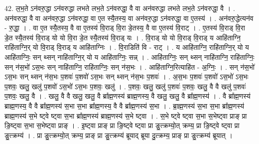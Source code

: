 \documentclass[17pt]{extarticle}
\begin{document}
42. ल॒भ॒ते ऽन॑वरु॒द्धा ऽन॑वरुद्धा लभते लभ॒ते ऽन॑वरुद्धा॒ वै वा अन॑वरुद्धा लभते लभ॒ते ऽन॑वरुद्धा॒ वै । . अन॑वरुद्धा॒ वै वा अन॑वरु॒द्धा ऽन॑वरुद्धा॒ वा ए॒त स्यै॒तस्य॒ वा अन॑वरु॒द्धा ऽन॑वरुद्धा॒ वा ए॒तस्य॑ । . अन॑वरु॒द्धेत्यन॑व - रु॒द्धा॒ । . वा ए॒त स्यै॒तस्य॒ वै वा ए॒तस्य॑ वि॒राड् वि॒रा डे॒तस्य॒ वै वा ए॒तस्य॑ वि॒राट् । . ए॒तस्य॑ वि॒राड् वि॒रा डे॒त स्यै॒तस्य॑ वि॒राड् यो यो वि॒रा डे॒त स्यै॒तस्य॑ वि॒राड् यः । . वि॒राड् यो यो वि॒राड् वि॒राड् य आहि॑ताग्नि॒ राहि॑ताग्नि॒र् यो वि॒राड् वि॒राड् य आहि॑ताग्निः । . वि॒राडिति॑ वि - राट् । . य आहि॑ताग्नि॒ राहि॑ताग्नि॒र् यो य आहि॑ताग्निः॒ सन् थ्सन् नाहि॑ताग्नि॒र् यो य आहि॑ताग्निः॒ सन्न् । . आहि॑ताग्निः॒ सन् थ्सन् नाहि॑ताग्नि॒ राहि॑ताग्निः॒ सन् न॑स॒भो॑ ऽस॒भः सन् नाहि॑ताग्नि॒ राहि॑ताग्निः॒ सन् न॑स॒भः । . आहि॑ताग्नि॒रित्याहि॑त - अ॒ग्निः॒ । . सन् न॑स॒भो॑ ऽस॒भः सन् थ्सन् न॑स॒भः प॒शवः॑ प॒शवो॑ ऽस॒भः सन् थ्सन् न॑स॒भः प॒शवः॑ । . अ॒स॒भः प॒शवः॑ प॒शवो॑ ऽस॒भो॑ ऽस॒भः प॒शवः॒ खलु॒ खलु॑ प॒शवो॑ ऽस॒भो॑ ऽस॒भः प॒शवः॒ खलु॑ । . प॒शवः॒ खलु॒ खलु॑ प॒शवः॑ प॒शवः॒ खलु॒ वै वै खलु॑ प॒शवः॑ प॒शवः॒ खलु॒ वै । . खलु॒ वै वै खलु॒ खलु॒ वै ब्रा᳚ह्म॒णस्य॑ ब्राह्म॒णस्य॒ वै खलु॒ खलु॒ वै ब्रा᳚ह्म॒णस्य॑ । . वै ब्रा᳚ह्म॒णस्य॑ ब्राह्म॒णस्य॒ वै वै ब्रा᳚ह्म॒णस्य॑ स॒भा स॒भा ब्रा᳚ह्म॒णस्य॒ वै वै ब्रा᳚ह्म॒णस्य॑ स॒भा । . ब्रा॒ह्म॒णस्य॑ स॒भा स॒भा ब्रा᳚ह्म॒णस्य॑ ब्राह्म॒णस्य॑ स॒भे ष्ट्वे ष्ट्वा स॒भा ब्रा᳚ह्म॒णस्य॑ ब्राह्म॒णस्य॑ स॒भे ष्ट्वा । . स॒भे ष्ट्वे ष्ट्वा स॒भा स॒भेष्ट्वा प्राङ् प्रा ङि॒ष्ट्वा स॒भा स॒भेष्ट्वा प्राङ् । . इ॒ष्ट्वा प्राङ् प्रा ङि॒ष्ट्वे ष्ट्वा प्रा ङु॒त्क्रम्यो॒त् क्रम्य॒ प्रा ङि॒ष्ट्वे ष्ट्वा प्रा ङु॒त्क्रम्य॑ । . प्रा ङु॒त्क्रम्यो॒त् क्रम्य॒ प्राङ् प्रा ङु॒त्क्रम्य॑ ब्रूयाद् ब्रूया दु॒त्क्रम्य॒ प्राङ् प्रा ङु॒त्क्रम्य॑ ब्रूयात् । \newline
\end{document}
